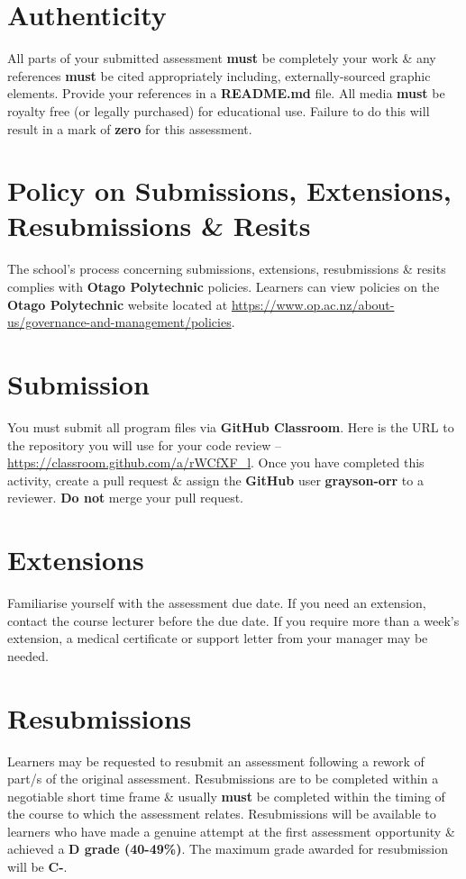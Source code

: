 \documentclass{article}
\begin{document}
\section*{Authenticity}
All parts of your submitted assessment \textbf{must} be completely your work \& any references \textbf{must} be cited appropriately including, externally-sourced graphic elements. Provide your references in a \textbf{README.md} file. All media \textbf{must} be royalty free (or legally purchased) for educational use. Failure to do this will result in a mark of \textbf{zero} for this assessment.

\section*{Policy on Submissions, Extensions, Resubmissions \& Resits}
The school's process concerning submissions, extensions, resubmissions \& resits complies with \textbf{Otago Polytechnic} policies. Learners can view policies on the \textbf{Otago Polytechnic} website located at \href{https://www.op.ac.nz/about-us/governance-and-management/policies}{https://www.op.ac.nz/about-us/governance-and-management/policies}.

\section*{Submission}
You must submit all program files via \textbf{GitHub Classroom}. Here is the URL to the repository you will use for your code review – \href{https://classroom.github.com/a/rWCfXF\_l}{https://classroom.github.com/a/rWCfXF\_l}. Once you have completed this activity, create a pull request \& assign the \textbf{GitHub} user \textbf{grayson-orr} to a reviewer. \textbf{Do not} merge your pull request.

\section*{Extensions}
Familiarise yourself with the assessment due date. If you need an extension, contact the course lecturer before the due date. If you require more than a week's extension, a medical certificate or support letter from your manager may be needed.

\section*{Resubmissions}
Learners may be requested to resubmit an assessment following a rework of part/s of the original assessment. Resubmissions are to be completed within a negotiable short time frame \& usually \textbf{must} be completed within the timing of the course to which the assessment relates. Resubmissions will be available to learners who have made a genuine attempt at the first assessment opportunity \& achieved a \textbf{D grade (40-49\%)}. The maximum grade awarded for resubmission will be \textbf{C-}.
\end{document}
